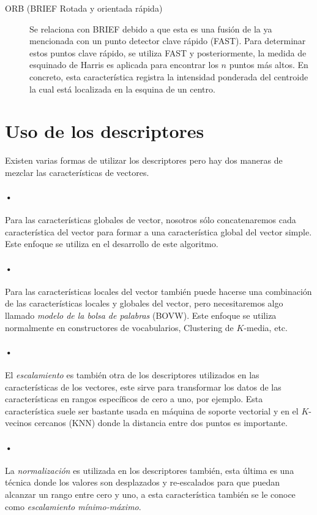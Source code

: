 \begin{description}
\item[ORB (BRIEF Rotada y orientada rápida)]{Se relaciona con BRIEF debido a
que esta es una fusión de la ya mencionada con un punto detector clave rápido (FAST). Para determinar estos puntos clave rápido, se utiliza FAST y posteriormente, la medida de esquinado de Harris es aplicada para encontrar los $n$ puntos más altos. En concreto, esta característica registra la intensidad ponderada del centroide la cual está localizada en la esquina de un centro.}
\end{description}

\section{Uso de los descriptores}
Existen varias formas de utilizar los descriptores pero hay dos maneras de mezclar las características de vectores.

\paragraph{•} Para las características globales de vector, nosotros sólo concatenaremos cada característica del vector para formar a una característica global del vector simple. Este enfoque se utiliza en el desarrollo de este algoritmo.

\paragraph{•} Para las características locales del vector también puede hacerse una combinación de las características locales y globales del vector, pero necesitaremos algo llamado \emph{modelo de la bolsa de palabras} (BOVW). Este enfoque se utiliza normalmente en constructores de vocabularios, Clustering de $K$-media, etc.

\paragraph{•} El \emph{escalamiento} es también otra de los descriptores utilizados en las características de los vectores, este sirve para transformar los datos de las características en rangos específicos de cero a uno, por ejemplo. Esta característica suele ser bastante usada en máquina de soporte vectorial y en el $K$-vecinos cercanos (KNN) donde la distancia entre dos puntos es importante.

\paragraph{•} La \emph{normalización} es utilizada en los descriptores también, esta última es una técnica donde los valores son desplazados y re-escalados  para que puedan alcanzar un rango entre cero y uno, a esta característica también se le conoce como \emph{escalamiento mínimo-máximo}.

